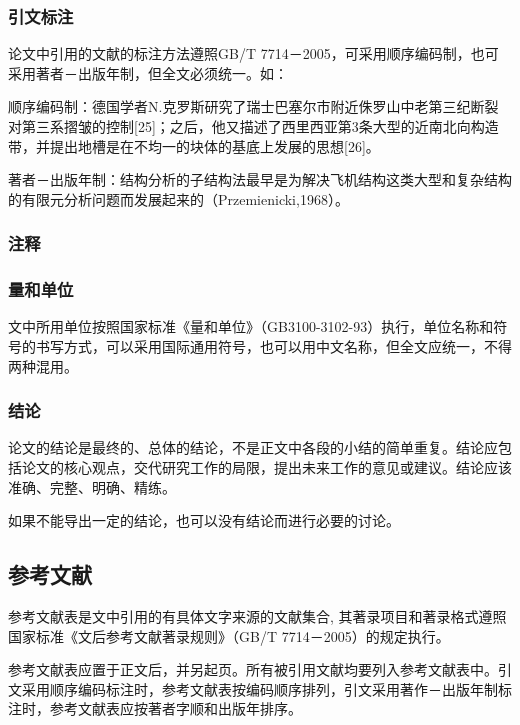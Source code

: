 \documentclass[a4paper,12pt,oneside,openany]{book}
\begin{document}
\subsubsection{引文标注}

论文中引用的文献的标注方法遵照GB/T 7714－2005，可采用顺序编码制，也可采用著者－出版年制，但全文必须统一。如：

顺序编码制：德国学者N.克罗斯研究了瑞士巴塞尔市附近侏罗山中老第三纪断裂对第三系摺皱的控制{[}25{]}；之后，他又描述了西里西亚第3条大型的近南北向构造带，并提出地槽是在不均一的块体的基底上发展的思想{[}26{]}。

著者－出版年制：结构分析的子结构法最早是为解决飞机结构这类大型和复杂结构的有限元分析问题而发展起来的（Przemienicki,1968）。 


\subsubsection{注释}




\subsubsection{量和单位}

文中所用单位按照国家标准《量和单位》（GB3100-3102-93）执行，单位名称和符号的书写方式，可以采用国际通用符号，也可以用中文名称，但全文应统一，不得两种混用。


\subsubsection{结论}

论文的结论是最终的、总体的结论，不是正文中各段的小结的简单重复。结论应包括论文的核心观点，交代研究工作的局限，提出未来工作的意见或建议。结论应该准确、完整、明确、精练。

如果不能导出一定的结论，也可以没有结论而进行必要的讨论。 


\subsection{参考文献}

参考文献表是文中引用的有具体文字来源的文献集合, 其著录项目和著录格式遵照国家标准《文后参考文献著录规则》（GB/T 7714－2005）的规定执行。

参考文献表应置于正文后，并另起页。所有被引用文献均要列入参考文献表中。引文采用顺序编码标注时，参考文献表按编码顺序排列，引文采用著作－出版年制标注时，参考文献表应按著者字顺和出版年排序。 
\end{document}

